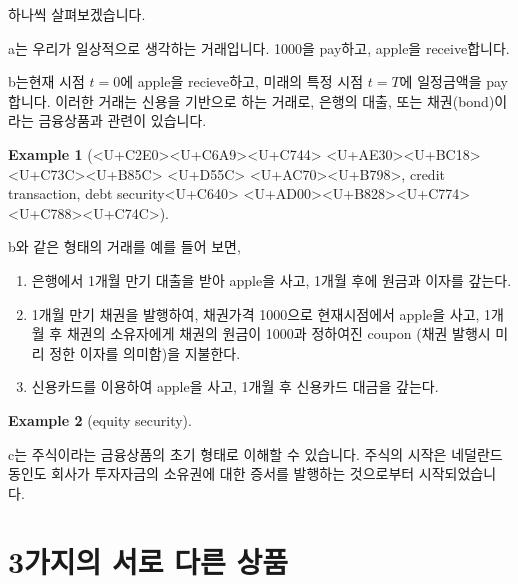 \documentclass[
]{book}
\theoremstyle{definition}
\theoremstyle{definition}
\newtheorem{example}{Example}[chapter]
\theoremstyle{definition}
\theoremstyle{remark}
\begin{document}
하나씩 살펴보겠습니다.

a는 우리가 일상적으로 생각하는 거래입니다. 1000을 pay하고, apple을 receive합니다.

b는현재 시점 \(t=0\)에 apple을 recieve하고, 미래의 특정 시점 \(t=T\)에 일정금액을 pay합니다. 이러한 거래는 신용을 기반으로 하는 거래로, 은행의 대출, 또는 채권(bond)이라는 금융상품과 관련이 있습니다.

\begin{example}[<U+C2E0><U+C6A9><U+C744> <U+AE30><U+BC18><U+C73C><U+B85C> <U+D55C> <U+AC70><U+B798>, credit transaction, debt security<U+C640> <U+AD00><U+B828><U+C774> <U+C788><U+C74C>]
\protect\hypertarget{exm:unnamed-chunk-6}{}{\label{exm:unnamed-chunk-6} \iffalse (\textless U+C2E0\textgreater\textless U+C6A9\textgreater\textless U+C744\textgreater{} \textless U+AE30\textgreater\textless U+BC18\textgreater\textless U+C73C\textgreater\textless U+B85C\textgreater{} \textless U+D55C\textgreater{} \textless U+AC70\textgreater\textless U+B798\textgreater, credit transaction, debt security\textless U+C640\textgreater{} \textless U+AD00\textgreater\textless U+B828\textgreater\textless U+C774\textgreater{} \textless U+C788\textgreater\textless U+C74C\textgreater) \fi{} }

b와 같은 형태의 거래를 예를 들어 보면,

\begin{enumerate}
\def\labelenumi{\arabic{enumi}.}
\item
  은행에서 1개월 만기 대출을 받아 apple을 사고, 1개월 후에 원금과 이자를 갚는다.
\item
  1개월 만기 채권을 발행하여, 채권가격 1000으로 현재시점에서 apple을 사고, 1개월 후 채권의 소유자에게 채권의 원금이 1000과 정하여진 coupon (채권 발행시 미리 정한 이자를 의미함)을 지불한다.
\item
  신용카드를 이용하여 apple을 사고, 1개월 후 신용카드 대금을 갚는다.
\end{enumerate}
\end{example}

\begin{example}[equity security]
\protect\hypertarget{exm:unnamed-chunk-7}{}{\label{exm:unnamed-chunk-7} \iffalse (equity security) \fi{} }

c는 주식이라는 금융상품의 초기 형태로 이해할 수 있습니다. 주식의 시작은 네덜란드 동인도 회사가 투자자금의 소유권에 대한 증서를 발행하는 것으로부터 시작되었습니다.
\end{example}

\hypertarget{uxac00uxc9c0uxc758-uxc11cuxb85c-uxb2e4uxb978-uxc0c1uxd488}{%
\section{3가지의 서로 다른 상품}\label{uxac00uxc9c0uxc758-uxc11cuxb85c-uxb2e4uxb978-uxc0c1uxd488}}
\end{document}
